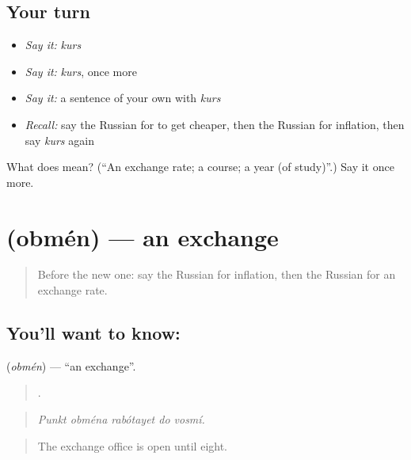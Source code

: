 \subsection*{Your turn}
\begin{itemize}
\raggedright
  \item \emph{Say it:} \emph{kurs}
  \item \emph{Say it:} \emph{kurs}, once more
  \item \emph{Say it:} a sentence of your own with \emph{kurs}
  \item \emph{Recall:} say the Russian for to get cheaper, then the Russian for inflation, then say \emph{kurs} again
\end{itemize}

\begin{tcolorbox}[breakable,colback=teal!4,colframe=teal!35!black,title={Before you move on}]
What does  mean? (\textquotedblleft{}An exchange rate; a course; a year (of study)\textquotedblright{}.) Say it once more.
\end{tcolorbox}
\section[\texorpdfstring{\ru{обмен} (obmén)}{обмен (obmén)}]{ (obmén) — an exchange}

\label{lesson:RU-C396-obmen}



\begin{quote}
Before the new one: say the Russian for inflation, then the Russian for an exchange rate.
\end{quote}

\subsection*{You'll want to know: }
\textbf{} (\emph{obmén}) — \textquotedblleft{}an exchange\textquotedblright{}.

\begin{quote}
    .
\end{quote}

\begin{quote}
\emph{Punkt obména rabótayet do vosmí.}
\end{quote}

\begin{quote}
The exchange office is open until eight.
\end{quote}

